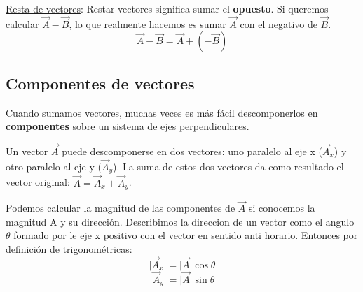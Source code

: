 \documentclass{article}
\newcommand{\newsubsection}[1]{
    \vspace{0.5cm}
    \color{sectionColor}
    \subsection{\bl{#1}}
    \color{black}
    \vspace{0.5cm}
}
\newcommand{\bl}[1]{\textbf{#1}}
\begin{document}
    \par \underline{Resta de vectores}: Restar vectores significa sumar el \bl{opuesto}. Si queremos calcular \(\vec{A}-\vec{B}\), lo que realmente hacemos es sumar \(\vec{A}\) con el negativo de \(\vec{B}\).
    \[ \vec{A}-\vec{B}=\vec{A}+(-\vec{B}) \]


    \newsubsection{Componentes de vectores}

    \par Cuando sumamos vectores, muchas veces es más fácil descomponerlos en \bl{componentes} sobre un sistema de ejes perpendiculares.
    \par Un vector \(\vec{A}\) puede descomponerse en dos vectores: uno paralelo al eje x (\(\vec{A}_x\)) y otro paralelo al eje y (\(\vec{A}_y\)). La suma de estos dos vectores da como resultado el vector original: \(\vec{A}=\vec{A}_x+\vec{A}_y\).

    \begin{figure}[H]
        \centering
		\shorthandoff{>}
		\shorthandoff{>}
    \end{figure}

    \par Podemos calcular la magnitud de las componentes de $\vec{A}$ si conocemos la magnitud A y su dirección. Describimos la direccion de un vector como el angulo $\theta$ formado por le eje x positivo con el vector en sentido anti horario. Entonces por definición de trigonométricas:
    \[ \lvert \vec{A}_x \rvert = \lvert \vec{A} \rvert \cos \theta \]
    \[ \lvert \vec{A}_y \rvert = \lvert \vec{A} \rvert \sin \theta \]
\end{document}
